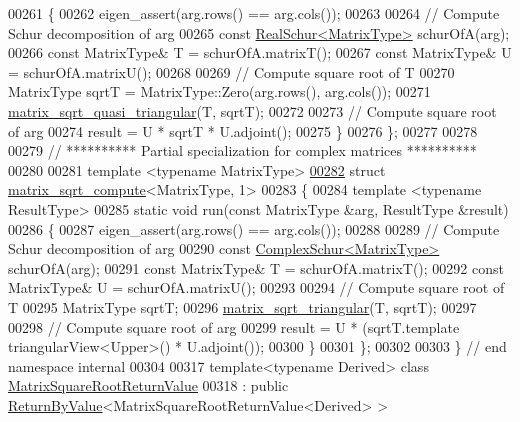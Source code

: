 \begin{DoxyCode}
00261   \{
00262     eigen\_assert(arg.rows() == arg.cols());
00263 
00264     \textcolor{comment}{// Compute Schur decomposition of arg}
00265     \textcolor{keyword}{const} \hyperlink{group___eigenvalues___module}{RealSchur<MatrixType>} schurOfA(arg);  
00266     \textcolor{keyword}{const} MatrixType& T = schurOfA.matrixT();
00267     \textcolor{keyword}{const} MatrixType& U = schurOfA.matrixU();
00268     
00269     \textcolor{comment}{// Compute square root of T}
00270     MatrixType sqrtT = MatrixType::Zero(arg.rows(), arg.cols());
00271     \hyperlink{namespace_eigen_a2f490197e16df831683018e383e29346}{matrix\_sqrt\_quasi\_triangular}(T, sqrtT);
00272     
00273     \textcolor{comment}{// Compute square root of arg}
00274     result = U * sqrtT * U.adjoint();
00275   \}
00276 \};
00277 
00278 
00279 \textcolor{comment}{// ********** Partial specialization for complex matrices **********}
00280 
00281 \textcolor{keyword}{template} <\textcolor{keyword}{typename} MatrixType>
\hyperlink{struct_eigen_1_1internal_1_1matrix__sqrt__compute_3_01_matrix_type_00_011_01_4}{00282} \textcolor{keyword}{struct }\hyperlink{struct_eigen_1_1internal_1_1matrix__sqrt__compute}{matrix\_sqrt\_compute}<MatrixType, 1>
00283 \{
00284   \textcolor{keyword}{template} <\textcolor{keyword}{typename} ResultType>
00285   \textcolor{keyword}{static} \textcolor{keywordtype}{void} run(\textcolor{keyword}{const} MatrixType &arg, ResultType &result)
00286   \{
00287     eigen\_assert(arg.rows() == arg.cols());
00288 
00289     \textcolor{comment}{// Compute Schur decomposition of arg}
00290     \textcolor{keyword}{const} \hyperlink{group___eigenvalues___module}{ComplexSchur<MatrixType>} schurOfA(arg);  
00291     \textcolor{keyword}{const} MatrixType& T = schurOfA.matrixT();
00292     \textcolor{keyword}{const} MatrixType& U = schurOfA.matrixU();
00293     
00294     \textcolor{comment}{// Compute square root of T}
00295     MatrixType sqrtT;
00296     \hyperlink{namespace_eigen_ae51c91f920f6ea4a7f6f72caa1e8249f}{matrix\_sqrt\_triangular}(T, sqrtT);
00297     
00298     \textcolor{comment}{// Compute square root of arg}
00299     result = U * (sqrtT.template triangularView<Upper>() * U.adjoint());
00300   \}
00301 \};
00302 
00303 \} \textcolor{comment}{// end namespace internal}
00304 
00317 \textcolor{keyword}{template}<\textcolor{keyword}{typename} Derived> \textcolor{keyword}{class }\hyperlink{class_eigen_1_1_matrix_square_root_return_value}{MatrixSquareRootReturnValue}
00318 : \textcolor{keyword}{public} \hyperlink{group___core___module_class_eigen_1_1_return_by_value}{ReturnByValue}<MatrixSquareRootReturnValue<Derived> >

\end{DoxyCode}
